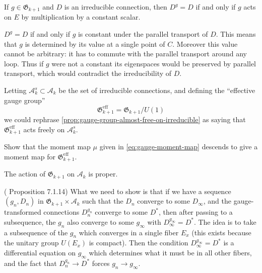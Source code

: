 \documentclass[12pt,letterpaper,reqno]{article}
\numberwithin{equation}{section}
\newcommand{\fG}{{\mathfrak G}}
\newcommand{\cA}{\ensuremath{\mathcal A}}
\newcommand{\eff}{\mathrm{eff}}
\begin{document}
\begin{prop} \label{prop:gauge-group-almost-free-on-irreducible}
If $g \in \fG_{k+1}$ and $D$ is an irreducible connection, then $D^g = D$
if and only if $g$ acts on $E$ by multiplication by a constant scalar.
\end{prop}
\begin{pf} $D^g = D$ if and only if $g$ is constant under the parallel
transport of $D$. This means that $g$ is determined by
its value at a single point of $C$. Moreover this value cannot be arbitrary:
it has to commute with the parallel transport around any loop.
Thus if $g$ were not a constant its eigenspaces would be preserved by parallel
transport, which would contradict the irreducibility of $D$.
\end{pf}

Letting $\cA^s_{k} \subset \cA_k$ be the set of irreducible connections,
and defining the ``effective gauge group''
\begin{equation}
 \fG^\eff_{k+1} = \fG_{k+1} / U(1)
\end{equation}
we could rephrase \autoref{prop:gauge-group-almost-free-on-irreducible}
as saying that $\fG^\eff_{k+1}$ acts freely on $\cA^s_k$.

\begin{exercise} Show that the moment map $\mu$ given in
\eqref{eq:gauge-moment-map} descends to give a
moment map for $\fG^\eff_{k+1}$.
\end{exercise}

\begin{prop} \label{prop:gauge-group-proper}
The action of $\fG_{k+1}$ on $\cA_k$ is proper.
\end{prop}
\begin{pf} (\cite{MR909698} Proposition 7.1.14) What we need to show is that
if we have a sequence $(g_n, D_n)$ in $\fG_{k+1} \times \cA_k$ such that the
$D_n$ converge to some $D_\infty$, and the
gauge-transformed connections $D_n^{g_n}$ converge to some $D^*$,
then after passing to a subsequence,
the $g_n$ also converge to some $g_\infty$ with $D_\infty^{g_\infty} = D^*$.
The idea is to take a subsequence
of the $g_n$ which converges in a single fiber $E_x$ (this exists
because the unitary group $U(E_x)$ is compact). Then the condition
$D_\infty^{g_\infty} = D^*$ is a differential equation on $g_\infty$
which determines what it must be in all other fibers, and the fact
that $D_n^{g_n} \to D^*$ forces $g_n \to g_\infty$.
\end{pf}
\end{document}
